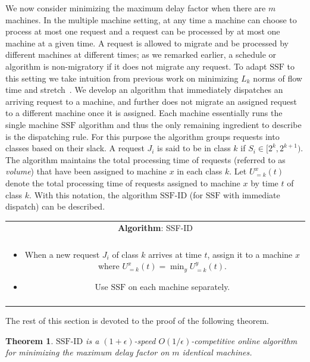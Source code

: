 \documentclass[10pt]{article}
\newtheorem{theorem}{Theorem}[section]
\theoremstyle{definition}
\numberwithin{equation}{section}
\newcommand{\eps}{\epsilon}
\newcommand{\Algorithm}[1]{{\textrm{#1}}} %
\newcommand{\sug}{\Algorithm{SSF}} %
\newcommand{\mmug}{\Algorithm{SSF-ID}} %
\begin{document}
We now consider minimizing the maximum delay factor when there are $m$
machines. In the multiple machine setting, at any time a machine can
choose to process at most one request and a request can be processed
by at most one machine at a given time. A request is allowed to
migrate and be processed by different machines at different times; as
we remarked earlier, a schedule or algorithm is non-migratory if it
does not migrate any request. To adapt $\sug$ to this setting we take
intuition from previous work on minimizing $L_k$ norms of flow time
and stretch~\cite{BansalP03,AvrahamiA03,ChekuriGKK04}. We develop an
algorithm that immediately dispatches an arriving request to a
machine, and further does not migrate an assigned request to a
different machine once it is assigned. Each machine essentially runs
the single machine $\sug$ algorithm and thus the only remaining
ingredient to describe is the dispatching rule. For this purpose the
algorithm groups requests into classes based on their slack. A request
$J_i$ is said to be in class $k$ if $S_i \in [2^k, 2^{k+1})$. The
algorithm maintains the total processing time of requests (referred to
as \emph{volume}) that have been assigned to machine $x$ in each class
$k$. Let $U^x_{=k}(t)$ denote the total processing time of requests
assigned to machine $x$ by time $t$ of class $k$. With this notation,
the algorithm $\mmug$ (for $\sug$ with immediate dispatch) can be
described.

\begin{center}
\begin{tabular}[r]{|c|}
\hline
\textbf{Algorithm}: \mmug \\

\\

\begin{minipage}{13cm}
\begin{itemize}
\item When a new request $J_i$ of class $k$ arrives at time $t$,
assign it to a machine $x$ where $U^x_{=k}(t) = \min_y U^y_{=k}(t)$.
\item Use $\sug$ on each machine separately.
\end{itemize}
\end{minipage}\\\\

\hline
\end{tabular}
\end{center}

The rest of this section is devoted to the proof of the following
theorem.
\begin{theorem}
\label{thm:multiple} $\mmug$ is a $(1+ \eps)$-speed $O({1/
\eps})$-competitive online algorithm for minimizing the maximum delay
factor on $m$ identical machines.
\end{theorem}
\end{document}
